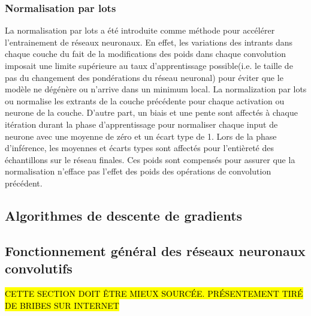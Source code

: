     \subsubsection{Normalisation par lots}
    La normalisation par lots \parencite{Ioffe:BatchNormalization:2015} a été introduite comme méthode pour accélérer l'entrainement de réseaux neuronaux. En effet, les variations des intrants dans chaque couche du fait de la modifications des poids dans chaque convolution imposait une limite supérieure au taux d'apprentissage possible(i.e. le taille de pas du changement des pondérations du réseau neuronal) pour éviter que le modèle ne dégénère ou n'arrive dans un minimum local. La normalization par lots ou  \fg{} normalise les extrants de la couche précédente pour chaque activation ou neurone de la couche. D'autre part, un biais et une pente sont affectés à chaque itération durant la phase d'apprentissage pour normaliser chaque input de neurone avec une moyenne de zéro et un écart type de 1. Lors de la phase d'inférence, les moyennes et écarts types sont affectés pour l'entièreté des échantillons sur le réseau finales. Ces poids sont compensés pour assurer que la normalisation n'efface pas l'effet des poids des opérations de convolution précédent. 
    \subsection{Algorithmes de descente de gradients} \label{ssec:grad_desc}

    \subsection{Fonctionnement général des réseaux neuronaux convolutifs}
    \hl{CETTE SECTION DOIT ÊTRE MIEUX SOURCÉE. PRÉSENTEMENT TIRÉ DE BRIBES SUR INTERNET}\par
